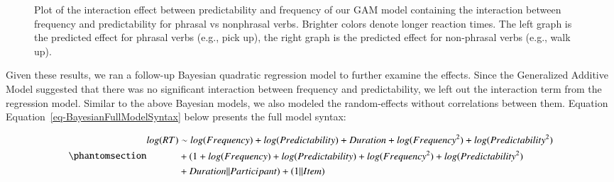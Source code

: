 \documentclass[
  authoryear,
  preprint,
  1p,
  onecolumn]{elsarticle}
\begin{document}
\begin{figure}


\caption{\label{fig-gam2dplot2}Plot of the interaction effect between
predictability and frequency of our GAM model containing the interaction
between frequency and predictability for phrasal vs nonphrasal verbs.
Brighter colors denote longer reaction times. The left graph is the
predicted effect for phrasal verbs (e.g., pick up), the right graph is
the predicted effect for non-phrasal verbs (e.g., walk up).}

\end{figure}%

Given these results, we ran a follow-up Bayesian quadratic regression
model to further examine the effects. Since the Generalized Additive
Model suggested that there was no significant interaction between
frequency and predictability, we left out the interaction term from the
regression model. Similar to the above Bayesian models, we also modeled
the random-effects without correlations between them. Equation
Equation~\ref{eq-BayesianFullModelSyntax} below presents the full model
syntax:

\begin{equation}\phantomsection\label{eq-BayesianFullModelSyntax}{
\begin{aligned}
log(RT) & \sim  log(Frequency) + log(Predictability) + Duration + log(Frequency^2)  + log(Predictability^2) \\ & + (1 + log(Frequency) + log(Predictability) + log(Frequency^2) + log(Predictability^2) \\& + Duration || Participant) + (1 || Item)
\end{aligned}
}\end{equation}
\end{document}
